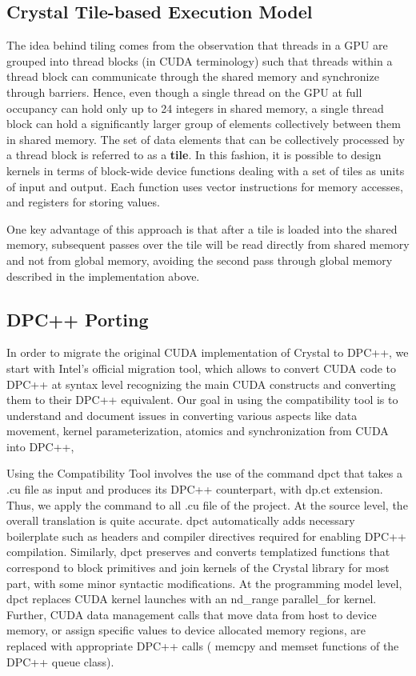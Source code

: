 \documentclass[sigconf, nonacm]{acmart}
\begin{document}
\subsection{Crystal Tile-based Execution Model}
The idea behind tiling comes from the observation that threads in a GPU are grouped into thread blocks (in CUDA terminology) such that threads within a thread block can communicate through the shared memory and synchronize through barriers. Hence, even though a single thread on the GPU at full occupancy can hold only up to 24 integers in shared memory, a single thread block can hold a significantly larger group of elements collectively between them in shared memory. 
The set of data elements that can be collectively processed by a thread block is referred to as a \textbf{tile}. In this fashion, it is possible to design kernels in terms of block-wide device functions dealing with a set of tiles as units of input and output. Each function uses vector instructions for memory accesses, and registers for storing values.

One key advantage of this approach is that after a tile
is loaded into the shared memory, subsequent passes over the
tile will be read directly from shared memory and not from
global memory, avoiding the second pass through global
memory described in the implementation above.

\subsection{DPC++ Porting}
In order to migrate the original CUDA implementation of Crystal to DPC++, we start with Intel's official migration tool, which allows to convert CUDA code to DPC++ at syntax level recognizing the main CUDA constructs and converting them to their DPC++ equivalent. Our goal in using the compatibility tool is to understand and document issues in converting various aspects like data movement, kernel parameterization, atomics and synchronization from CUDA into DPC++,

Using the Compatibility Tool involves the use of the command
dpct that takes a .cu file as input and produces its DPC++ counterpart, with dp.ct extension. Thus, we apply the command to all .cu file of the project. At the source level, the overall translation is quite accurate. dpct automatically adds necessary boilerplate such as headers and compiler directives required for enabling DPC++ compilation. Similarly, dpct preserves and converts templatized functions that correspond to block primitives and join kernels of the Crystal library for most part, with some minor syntactic modifications. At
the programming model level, dpct replaces CUDA kernel launches
with an nd\_range parallel\_for kernel. Further, CUDA data management calls that move data from host to device memory, or assign specific values to device allocated memory regions, are replaced with appropriate DPC++ calls ( memcpy and memset functions of the DPC++ queue class).
\end{document}
